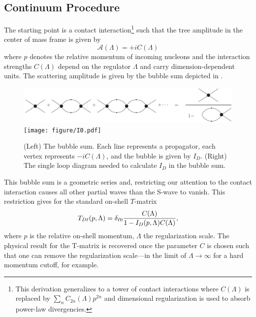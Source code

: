 \subsection{Continuum Procedure}\label{sec:continuum}
The starting point is a contact interaction\footnote{This derivation generalizes to a tower of contact interactions where $C(\Lambda)$ is replaced by $\sum_n C_{2n}(\Lambda) p^{2n}$ \cite{Kaplan:1998we,Beane:2003da} and dimensional regularization is used to absorb power-law divergencies.} such that the tree amplitude in the center of mass frame is given by
\begin{equation}
    \mathcal A(\Lambda) = + i C(\Lambda)
\end{equation}
where $p$ denotes the relative momentum of incoming nucleons and the interaction strengths $ C(\Lambda)$ depend on the regulator $\Lambda$ and carry dimension-dependent units.
The scattering amplitude is given by the bubble sum depicted in .

\begin{figure}[ht!]
\center
\includegraphics[width=.675\columnwidth]{figure/bubbleSum.pdf}
\hfill
\texttt{[image: figure/I0.pdf]}
\caption{(Left) The bubble sum. Each line represents a propagator, each vertex represents $-i C(\Lambda)$, and the bubble is given by $I_D$.
(Right) The single loop diagram needed to calculate $I_D$ in the bubble sum.
\label{fig:bubbleSum}}
\end{figure}

This bubble sum is a geometric series and, restricting our attention to the contact interaction causes all other partial waves than the S-wave to vanish.
This restriction gives for the standard on-shell $T$-matrix
\begin{equation}\label{eq:T matrix}
T_{D\ell}(p, \Lambda) = \delta_{\ell 0} \frac{C(\Lambda)}{1-I_D(p,\Lambda) C(\Lambda)},
\end{equation}
where $p$ is the relative on-shell momentum, $\Lambda$ the regularization scale.
The physical result for the T-matrix is recovered once the parameter $C$ is chosen such that one can remove the regularization scale---in the limit of $\Lambda \to \infty$ for a hard momentum cutoff, for example.

